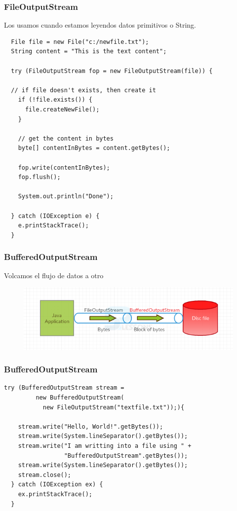 \documentclass{beamer}
\begin{document}
\begin{frame}[fragile]
\frametitle{FileOutputStream}
Los usamos cuando estamos leyendos datos primitivos o String.
\pause
\begin{scriptsize}
\begin{verbatim}
  File file = new File("c:/newfile.txt");
  String content = "This is the text content";

  try (FileOutputStream fop = new FileOutputStream(file)) {

  // if file doesn't exists, then create it
    if (!file.exists()) {
      file.createNewFile();
    }

    // get the content in bytes
    byte[] contentInBytes = content.getBytes();

    fop.write(contentInBytes);
    fop.flush();

    System.out.println("Done");

  } catch (IOException e) {
    e.printStackTrace();
  }
\end{verbatim}
\end{scriptsize}
\end{frame}

\begin{frame}
\frametitle{BufferedOutputStream}
Volcamos el flujo de datos a otro
\begin{figure}
\includegraphics[scale=0.7]{imagenes/filebufferout.png}
\end{figure}
\end{frame}




\begin{frame}[fragile]
\frametitle{BufferedOutputStream}
\begin{verbatim}
try (BufferedOutputStream stream =
         new BufferedOutputStream(
           new FileOutputStream("textfile.txt"));){
  
    stream.write("Hello, World!".getBytes());
    stream.write(System.lineSeparator().getBytes());
    stream.write("I am writting into a file using " + 
                 "BufferedOutputStream".getBytes());
    stream.write(System.lineSeparator().getBytes());
    stream.close();
  } catch (IOException ex) {
    ex.printStackTrace();
  }
\end{verbatim}
\end{frame}
\end{document}
